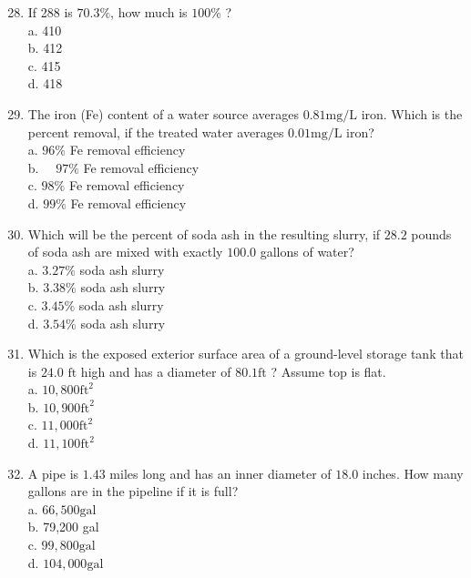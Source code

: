 \documentclass[10pt]{article}
\begin{document}
\begin{enumerate}
  \setcounter{enumi}{27}
  \item If 288 is $70.3 \%$, how much is $100 \%$ ?\\
a. 410\\
b. 412\\
c. 415\\
d. 418

  \item The iron (Fe) content of a water source averages $0.81 \mathrm{mg} / \mathrm{L}$ iron. Which is the percent removal, if the treated water averages $0.01 \mathrm{mg} / \mathrm{L}$ iron?\\
a. $96 \%$ Fe removal efficiency\\
b. $\quad 97 \%$ Fe removal efficiency\\
c. $98 \%$ Fe removal efficiency\\
d. $99 \%$ Fe removal efficiency

  \item Which will be the percent of soda ash in the resulting slurry, if $28.2$ pounds of soda ash are mixed with exactly $100.0$ gallons of water?\\
a. $3.27 \%$ soda ash slurry\\
b. $3.38 \%$ soda ash slurry\\
c. $3.45 \%$ soda ash slurry\\
d. $3.54 \%$ soda ash slurry

  \item Which is the exposed exterior surface area of a ground-level storage tank that is $24.0$ $\mathrm{ft}$ high and has a diameter of $80.1 \mathrm{ft}$ ? Assume top is flat.\\
a. $10,800 \mathrm{ft}^{2}$\\
b. $10,900 \mathrm{ft}^{2}$\\
c. $11,000 \mathrm{ft}^{2}$\\
d. $11,100 \mathrm{ft}^{2}$

  \item A pipe is $1.43$ miles long and has an inner diameter of $18.0$ inches. How many gallons are in the pipeline if it is full?\\
a. $66,500 \mathrm{gal}$\\
b. 79,200 gal\\
c. $99,800 \mathrm{gal}$\\
d. $104,000 \mathrm{gal}$


\end{enumerate}
\end{document}
